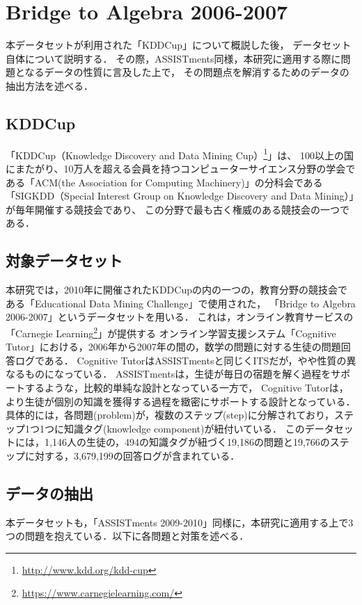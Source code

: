 \section{Bridge to Algebra 2006-2007}
本データセットが利用された「KDDCup」について概説した後，
データセット自体について説明する．
その際，ASSISTments同様，本研究に適用する際に問題となるデータの性質に言及した上で，
その問題点を解消するためのデータの抽出方法を述べる．


\subsection{KDDCup}
「KDDCup（Knowledge Discovery and Data Mining Cup）\footnote{\url{http://www.kdd.org/kdd-cup}}」は、
100以上の国にまたがり、10万人を超える会員を持つコンピューターサイエンス分野の学会である「ACM(the Association for Computing Machinery)」の分科会である
「SIGKDD（Special Interest Group on Knowledge Discovery and Data Mining）」が毎年開催する競技会であり、
この分野で最も古く権威のある競技会の一つである．


\subsection{対象データセット}
本研究では，2010年に開催されたKDDCupの内の一つの，教育分野の競技会である「Educational Data Mining Challenge」で使用された，
「Bridge to Algebra 2006-2007」\cite{kddcup2010bridge2006}というデータセットを用いる．
これは，オンライン教育サービスの「Carnegie Learning\footnote{\url{https://www.carnegielearning.com/}}」が提供する
オンライン学習支援システム「Cognitive Tutor」における，2006年から2007年の間の，数学の問題に対する生徒の問題回答ログである．%
Cognitive TutorはASSISTmentsと同じくITSだが，やや性質の異なるものになっている．
ASSISTmentsは，生徒が毎日の宿題を解く過程をサポートするような，比較的単純な設計となっている一方で，
Cognitive Tutorは，より生徒が個別の知識を獲得する過程を緻密にサポートする設計となっている．
具体的には，各問題(problem)が，複数のステップ(step)に分解されており，ステップ1つ1つに知識タグ(knowledge component)が紐付いている．
このデータセットには，1,146人の生徒の，494の知識タグが紐づく19,186の問題と19,766のステップに対する，3,679,199の回答ログが含まれている．


\subsection{データの抽出}
本データセットも，「ASSISTments 2009-2010」同様に，本研究に適用する上で3つの問題を抱えている．以下に各問題と対策を述べる．

